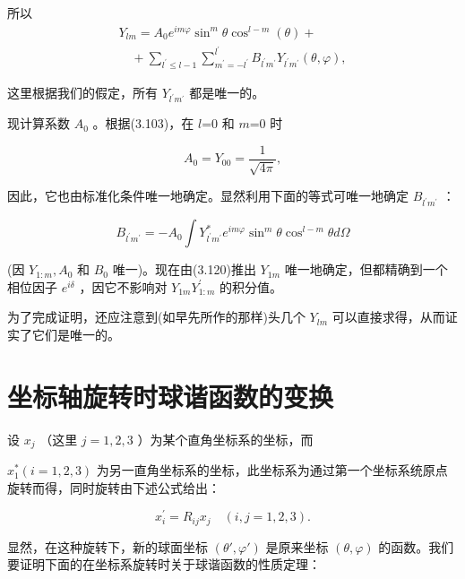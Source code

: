所以
\begin{equation*}
\begin{array}{l} Y _ {l m} = A _ {0} e ^ {i m \varphi} \sin^ {m} \theta \cos^ {l - m} (\theta) + \\ \quad + \sum_ {l ^ {\prime} \leq l - 1} \sum_ {m ^ {\prime} = - l ^ {\prime}} ^ {l ^ {\prime}} B _ {l ^ {\prime} m ^ {\prime}} Y _ {l ^ {\prime} m ^ {\prime}} (\theta , \varphi), \end{array}\tag{3.120}
\end{equation*}

这里根据我们的假定，所有 $Y_{l^{\prime}m^{\prime}}$ 都是唯一的。

现计算系数 $A_{0}$ 。根据(3.103)，在 $l$=0 和 $m$=0 时

\begin{equation*}
A _ {0} = Y _ {0 0} = \frac {1}{\sqrt {4 \pi}},
\end{equation*}

因此，它也由标准化条件唯一地确定。显然利用下面的等式可唯一地确定 $B_{l^{\prime}m^{\prime}}$ ：

\begin{equation*}
B _ {l ^ {\prime} m ^ {\prime}} = - A _ {0} \int Y _ {l ^ {\prime} m ^ {\prime}} ^ {*} e ^ {i m \varphi} \sin^ {m} \theta \cos^ {l - m} \theta d \Omega
\end{equation*}

(因 $Y_{1:m}, A_0$ 和 $B_0$ 唯一)。现在由(3.120)推出 $Y_{1m}$ 唯一地确定，但都精确到一个相位因子 $e^{i\delta}$ ，因它不影响对 $Y_{1m}Y_{1:m}^{\prime}$ 的积分值。

为了完成证明，还应注意到(如早先所作的那样)头几个 $Y_{lm}$ 可以直接求得，从而证实了它们是唯一的。

\section{坐标轴旋转时球谐函数的变换}

设 $x_{j}$ （这里 $j = 1,2,3$ ）为某个直角坐标系的坐标，而

$x_{1}^{*}(i = 1,2,3)$ 为另一直角坐标系的坐标，此坐标系为通过第一个坐标系统原点旋转而得，同时旋转由下述公式给出：

\begin{equation*}
x _ {i} ^ {\prime} = R _ {i j} x _ {j} \quad (i, j = 1, 2, 3).\tag{3.121}
\end{equation*}

显然，在这种旋转下，新的球面坐标 $(\theta', \varphi')$ 是原来坐标 $(\theta, \varphi)$ 的函数。我们要证明下面的在坐标系旋转时关于球谐函数的性质定理：

